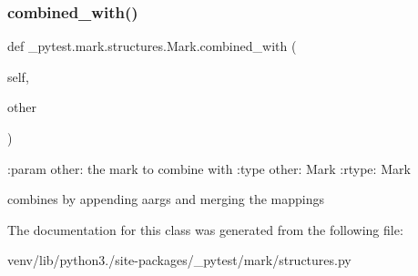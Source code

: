 \subsubsection{\texorpdfstring{combined\+\_\+with()}{combined\_with()}}
{\footnotesize\ttfamily def \+\_\+pytest.\+mark.\+structures.\+Mark.\+combined\+\_\+with (\begin{DoxyParamCaption}\item[{}]{self,  }\item[{}]{other }\end{DoxyParamCaption})}

\begin{DoxyVerb}:param other: the mark to combine with
:type other: Mark
:rtype: Mark

combines by appending aargs and merging the mappings
\end{DoxyVerb}
 

The documentation for this class was generated from the following file\+:\begin{DoxyCompactItemize}
\item 
venv/lib/python3./site-\/packages/\+\_\+pytest/mark/structures.\+py\end{DoxyCompactItemize}
